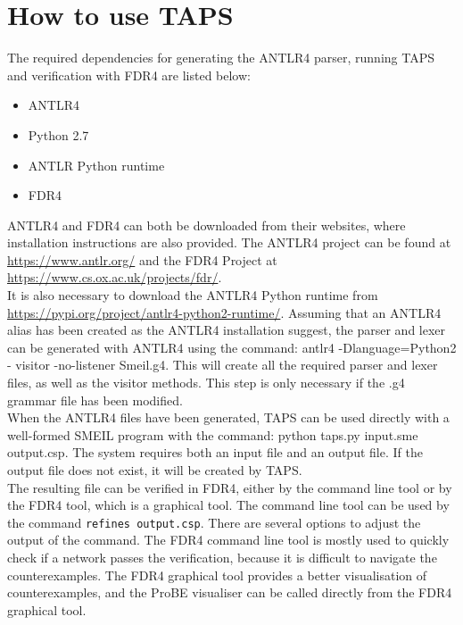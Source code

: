 \chapter{How to use TAPS}
The required dependencies for generating the ANTLR4 parser, running TAPS and verification with FDR4 are listed below:
\begin{itemize}
    \item ANTLR4
    \item Python 2.7
    \item ANTLR Python runtime
    \item FDR4
\end{itemize}

ANTLR4 and FDR4 can both be downloaded from their websites, where installation instructions are also provided.
The ANTLR4 project can be found at \url{https://www.antlr.org/} and the FDR4 Project at \url{https://www.cs.ox.ac.uk/projects/fdr/}.\\
It is also necessary to download the ANTLR4 Python runtime from \url{https://pypi.org/project/antlr4-python2-runtime/}.
Assuming that an ANTLR4 alias has been created as the ANTLR4 installation suggest, the parser and lexer can be generated with ANTLR4 using the command: {\ttfamily antlr4 -Dlanguage=Python2 - visitor -no-listener Smeil.g4.}
This will create all the required parser and lexer files, as well as the visitor methods. This step is only necessary if the .g4 grammar file has been modified.\\

When the ANTLR4 files have been generated, TAPS can be used directly with a well-formed SMEIL program with the command: {\ttfamily python taps.py input.sme output.csp}. The system requires both an input file and an output file. If the output file does not exist, it will be created by TAPS. \\

The resulting \cspm{} file can be verified in FDR4, either by the command line tool or by the FDR4 tool, which is a graphical tool. The command line tool can be used by the command \texttt{refines output.csp}. There are several options to adjust the output of the command. The FDR4 command line tool is mostly used to quickly check if a network passes the verification, because it is difficult to navigate the counterexamples. The FDR4 graphical tool provides a better visualisation of counterexamples, and the ProBE visualiser can be called directly from the FDR4 graphical tool.

